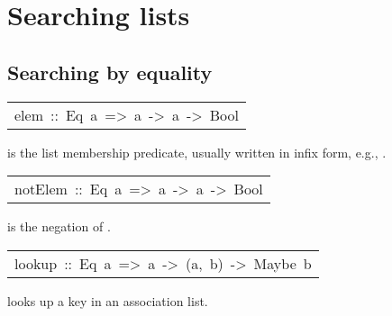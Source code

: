 \section{Searching lists
}
\subsection{Searching by equality
}
\begin{haddockdesc}
\item[\begin{tabular}{@{}l}
elem\ ::\ Eq\ a\ =>\ a\ ->\ {\char 91}a{\char 93}\ ->\ Bool
\end{tabular}]\haddockbegindoc
{} is the list membership predicate, usually written in infix form,
 e.g., .
\par

\end{haddockdesc}
\begin{haddockdesc}
\item[\begin{tabular}{@{}l}
notElem\ ::\ Eq\ a\ =>\ a\ ->\ {\char 91}a{\char 93}\ ->\ Bool
\end{tabular}]\haddockbegindoc
{} is the negation of .
\par

\end{haddockdesc}
\begin{haddockdesc}
\item[\begin{tabular}{@{}l}
lookup\ ::\ Eq\ a\ =>\ a\ ->\ {\char 91}(a,\ b){\char 93}\ ->\ Maybe\ b
\end{tabular}]\haddockbegindoc
{}  looks up a key in an association list.
\par

\end{haddockdesc}
